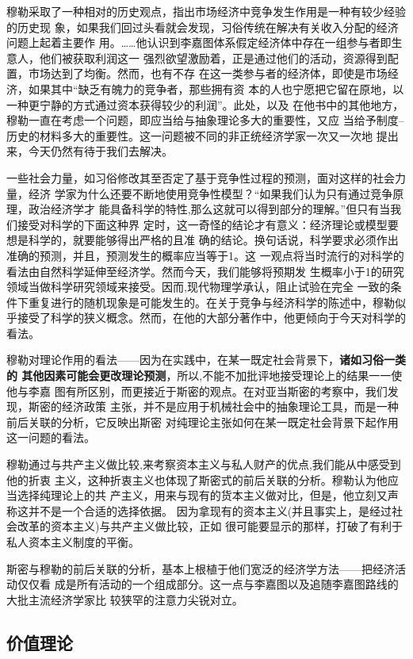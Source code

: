 穆勒采取了一种相对的历史观点，指出市场经济中竞争发生作用是一种有较少经验的历史现
象，如果我们回过头看就会发现，习俗传统在解决有关收入分配的经济问题上起着主要作
用。……他认识到李嘉图体系假定经济体中存在一组参与者即生意人，他们被获取利润这一
强烈欲望激励着，正是通过他们的活动，资源得到配置，市场达到了均衡。然而，也有不存
在这一类参与者的经济体，即使是市场经济，如果其中“缺乏有魄力的竞争者，那些拥有资
本的人也宁愿把它留在原地，以一种更宁静的方式通过资本获得较少的利润”。此处，以及
在他书中的其他地方，穆勒一直在考虑一个问题，即应当给与抽象理论多大的重要性，又应
当给予制度--历史的材料多大的重要性。这一问题被不同的非正统经济学家一次又一次地
提出来，今天仍然有待于我们去解决。

一些社会力量，如习俗修改其至否定了基于竞争性过程的预测，面对这样的社会力量，经济
学家为什么还要不断地使用竞争性模型？“如果我们认为只有通过竞争原理，政治经济学才
能具备科学的特性,那么这就可以得到部分的理解。”但只有当我们接受对科学的下面这种界
定时，这一奇怪的结论才有意义：经济理论或模型要想是科学的，就要能够得出严格的且准
确的结论。换句话说，科学要求必须作出准确的预测，并且，预测发生的概率应当等于1。这
一观点将当时流行的对科学的看法由自然科学延伸至经济学。然而今天，我们能够将预期发
生概率小于1的研究领域当做科学研究领域来接受。因而,现代物理学承认，阻止试验在完全
一致的条件下重复进行的随机现象是可能发生的。在关于竞争与经济科学的陈述中，穆勒似
乎接受了科学的狭义概念。然而，在他的大部分著作中，他更倾向于今天对科学的看法。


穆勒对理论作用的看法——因为在实践中，在某一既定社会背景下，\textbf{诸如习俗一类的
  其他因素可能会更改理论预测}，所以,不能不加批评地接受理论上的结果一一使他与李嘉
图有所区别，而更接近于斯密的观点。在对亚当斯密的考察中，我们发现，斯密的经济政策
主张，并不是应用于机械社会中的抽象理论工具，而是一种前后关联的分析，它反映出斯密
对纯理论主张如何在某一既定社会背景下起作用这一问题的看法。

穆勒通过与共产主义做比较,来考察资本主义与私人财产的优点,我们能从中感受到他的折衷
主义，这种折衷主义也体现了斯密式的前后关联的分析。穆勒认为他应当选择纯理论上的共
产主义，用来与现有的货本主义做对比，但是，他立刻又声称这并不是一个合适的选择依据。
因为拿现有的资本主义(并且事实上，是经过社会改革的资本主义)与共产主义做比较，正如
很可能要显示的那样，打破了有利于私人资本主义制度的平衡。

斯密与穆勒的前后关联的分析，基本上根植于他们宽泛的经济学方法——把经济活动仅仅看
成是所有活动的一个组成部分。这一点与李嘉图以及追随李嘉图路线的大批主流经济学家比
较狭罕的注意力尖锐对立。
\clearpage
\subsection{价值理论}

